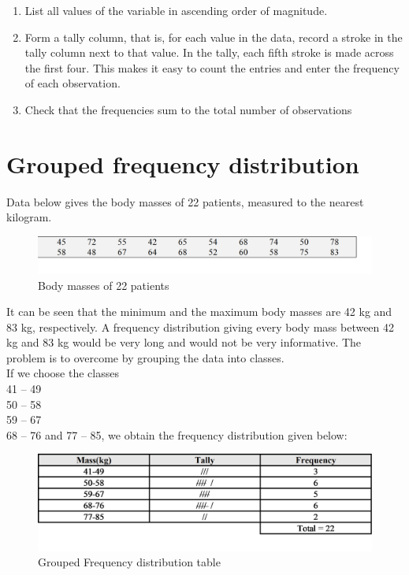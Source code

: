 \documentclass[
]{book}
\begin{document}
\begin{enumerate}
\def\labelenumi{\arabic{enumi}.}
\item
  List all values of the variable in ascending order of magnitude.
\item
  Form a tally column, that is, for each value in the data, record a stroke in the tally column next to that value. In the tally, each fifth stroke is made across the first four. This makes it easy to count the entries and enter the frequency of each observation.
\item
  Check that the frequencies sum to the total number of observations
\end{enumerate}

\hypertarget{grouped-frequency-distribution}{%
\section{Grouped frequency distribution}\label{grouped-frequency-distribution}}

Data below gives the body masses of 22 patients, measured to the nearest kilogram.

\begin{figure}

{\centering \includegraphics[width=0.7\linewidth]{images/image5} 

}

\caption{Body masses of 22 patients}\label{fig:mass}
\end{figure}

It can be seen that the minimum and the maximum body masses are 42 kg and 83 kg, respectively. A frequency distribution giving every body mass between 42 kg and 83 kg would be very long and would not be very informative. The problem is to overcome by grouping the data into classes.\\
If we choose the classes\\
41 -- 49\\
50 -- 58\\
59 -- 67\\
68 -- 76
and 77 -- 85, we obtain the frequency distribution given below:

\begin{figure}

{\centering \includegraphics[width=0.7\linewidth]{images/image6} 

}

\caption{Grouped Frequency distribution table}\label{fig:grptable}
\end{figure}
\end{document}
